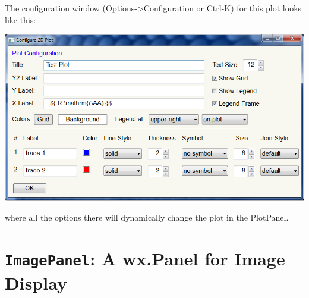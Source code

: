 \documentclass[letterpaper,10pt,english]{sphinxmanual}
\begin{document}
The configuration window (Options-\textgreater{}Configuration or Ctrl-K) for this plot looks
like this:

\includegraphics{configuration_frame.png}

where all the options there will dynamically change the plot in the PlotPanel.


\chapter{\texttt{ImagePanel}:  A wx.Panel for Image Display}
\label{imagepanel:imagepanel-a-wx-panel-for-image-display}\label{imagepanel::doc}


\renewcommand{\indexname}{Index}
\printindex
\end{document}
